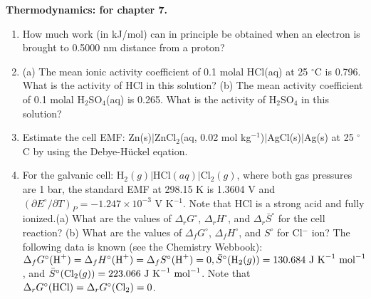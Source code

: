 \noindent
\textbf{Thermodynamics:
 for chapter 7.}\\

\begin{enumerate}

\item How much work (in kJ/mol) can in principle be obtained when an electron is brought to 0.5000 nm distance from a proton?\\


\item (a) The mean ionic activity coefficient of 0.1 molal HCl(aq) at 25 $^\circ$C is 0.796. What is the activity of HCl in this solution? (b) The mean activity coefficient of 0.1 molal H$_2$SO$_4$(aq) is 0.265. What is the activity of H$_2$SO$_4$ in this solution?\\


\item Estimate the cell EMF: Zn(s)$\vert$ZnCl$_2$(aq, 0.02 mol kg$^{-1}$)$\vert$AgCl(s)$\vert$Ag(s) at 25 $^\circ$C by using the Debye-H\"uckel eqation.\\


\item For the galvanic cell: H$_2(g)\vert$HCl$(aq)\vert$Cl$_2(g)$, where both gas pressures are 1 bar, the standard EMF at 298.15 K is 1.3604 V and $\left(\partial E^\circ / \partial T\right)_P = -1.247\times 10^{-3}$ V K$^{-1}$. Note that HCl is a strong acid and fully ionized.(a) What are the values of $\Delta_rG^\circ$, $\Delta_rH^\circ$, and $\Delta_r\bar{S}^\circ$ for the cell reaction? (b) What are the values of $\Delta_fG^\circ$, $\Delta_fH^\circ$, and $S^\circ$ for Cl$^-$ ion? The following data is known (see the Chemistry Webbook): $\Delta_fG^\circ(\textnormal{H}^+) = \Delta_fH^\circ(\textnormal{H}^+) = \Delta_fS^\circ(\textnormal{H}^+) = 0, \bar{S}^\circ(\textnormal{H}_2(g)) = 130.684\textnormal{ J K}^{-1}\textnormal{ mol}^{-1}$, and $\bar{S}^\circ(\textnormal{Cl}_2(g)) = 223.066\textnormal{ J K}^{-1}\textnormal{ mol}^{-1}$. Note that $\Delta_r G^\circ(\textnormal{HCl}) = \Delta_r G^\circ(\textnormal{Cl}_2) = 0$.\\


\end{enumerate}

